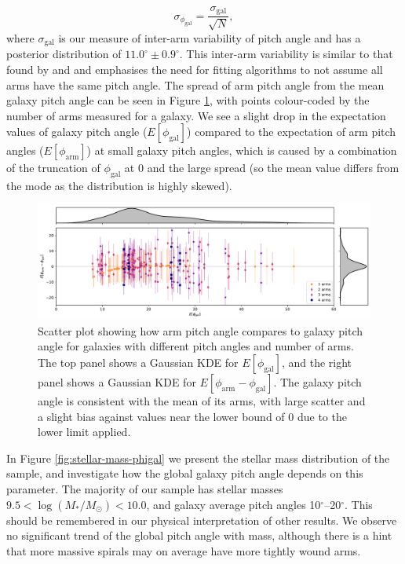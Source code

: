 \begin{equation}
  \sigma_{\phi_\mathrm{gal}} = \frac{\sigma_\mathrm{gal}}{\sqrt{N}},
\end{equation}
where $\sigma_\mathrm{gal}$ is our measure of inter-arm variability of pitch angle and has a posterior distribution of $11.0^\circ\pm 0.9^\circ$. This inter-arm variability is similar to that found by \citet{1981AJ.....86.1847K} and \citet{2014ApJ...790...87D} and emphasises the need for fitting algorithms to not assume all arms have the same pitch angle. The spread of arm pitch angle from the mean galaxy pitch angle can be seen in Figure \ref{fig:arm-pa-spread}, with points colour-coded by the number of arms measured for a galaxy. We see a slight drop in the expectation values of galaxy pitch angle ($E[\phi_\mathrm{gal}]$) compared to the expectation of arm pitch angles ($E[\phi_\mathrm{arm}]$) at small galaxy pitch angles, which is caused by a combination of the truncation of $\phi_\mathrm{gal}$ at {0\degree} and the large spread (so the mean value differs from the mode as the distribution is highly skewed).

\begin{figure}
  \includegraphics[width=17.7cm]{plots/arm_pa_spread.pdf}
  \caption{Scatter plot showing how arm pitch angle compares to galaxy pitch angle for galaxies with different pitch angles and number of arms. The top panel shows a Gaussian KDE for $E[\phi_\mathrm{gal}]$, and the right panel shows a Gaussian KDE for $E[\phi_\mathrm{arm} - \phi_\mathrm{gal}]$. The galaxy pitch angle is consistent with the mean of its arms, with large scatter and a slight bias against values near the lower bound of $0$ due to the lower limit applied.}
  \label{fig:arm-pa-spread}
\end{figure}

In Figure \ref{fig:stellar-mass-phigal} we present the stellar mass distribution of the sample, and investigate how the global galaxy pitch angle depends on this parameter. The majority of our sample has stellar masses $9.5 < \log(M_* / M_\odot) < 10.0$, and galaxy average pitch angles 10$^\circ$--20$^\circ$. This should be remembered in our physical interpretation of other results. We observe no significant trend of the global pitch angle with mass, although there is a hint that more massive spirals may on average have more tightly wound arms.

